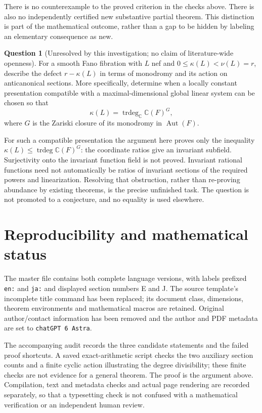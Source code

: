 \documentclass[12pt]{amsart}
\theoremstyle{definition}
\newtheorem{ques}[thm]{Question}
\theoremstyle{remark}
\numberwithin{equation}{section}
\DeclareMathOperator{\Autop}{Aut}
\newcommand{\C}{\mathbb{C}}
\begin{document}
There is no counterexample to the proved criterion in the checks above. There is also no independently certified new substantive partial theorem. This distinction is part of the mathematical outcome, rather than a gap to be hidden by labeling an elementary consequence as new.

\begin{ques}[Unresolved by this investigation; no claim of literature-wide openness]\label{en:question}
For a smooth Fano fibration with $L$ nef and $0\leq\kappa(L)<\nu(L)=r$, describe the defect $r-\kappa(L)$ in terms of monodromy and its action on anticanonical sections. More specifically, determine when a locally constant presentation compatible with a maximal-dimensional global linear system can be chosen so that
\[
 \kappa(L)=\operatorname{trdeg}_{\C}\C(F)^G,
\]
where $G$ is the Zariski closure of its monodromy in $\Autop(F)$.
\end{ques}
For such a compatible presentation the argument here proves only the inequality $\kappa(L)\leq\operatorname{trdeg}\C(F)^G$: the coordinate ratios give an invariant subfield. Surjectivity onto the invariant function field is not proved. Invariant rational functions need not automatically be ratios of invariant sections of the required powers and linearization. Resolving that obstruction, rather than re-proving abundance by existing theorems, is the precise unfinished task. The question is not promoted to a conjecture, and no equality is used elsewhere.

\section{Reproducibility and mathematical status}\label{en:repro}
The master file contains both complete language versions, with labels prefixed \texttt{en:} and \texttt{ja:} and displayed section numbers E and J. The source template's incomplete title command has been replaced; its document class, dimensions, theorem environments and mathematical macros are retained. Original author/contact information has been removed and the author and PDF metadata are set to \texttt{chatGPT 6 Astra}.

The accompanying audit records the three candidate statements and the failed proof shortcuts. A saved exact-arithmetic script checks the two auxiliary section counts and a finite cyclic action illustrating the degree divisibility; these finite checks are not evidence for a general theorem. The proof is the argument above. Compilation, text and metadata checks and actual page rendering are recorded separately, so that a typesetting check is not confused with a mathematical verification or an independent human review.
\end{document}
